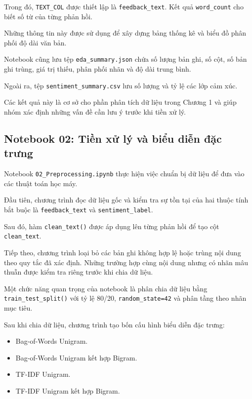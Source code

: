 Trong đó, \texttt{TEXT\_COL} được thiết lập là \texttt{feedback\_text}. Kết quả \texttt{word\_count} cho biết số từ của từng phản hồi.

Những thông tin này được sử dụng để xây dựng bảng thống kê và biểu đồ phân phối độ dài văn bản.

Notebook cũng lưu tệp \texttt{eda\_summary.json} chứa số lượng bản ghi, số cột, số bản ghi trùng, giá trị thiếu, phân phối nhãn và độ dài trung bình.

Ngoài ra, tệp \texttt{sentiment\_summary.csv} lưu số lượng và tỷ lệ các lớp cảm xúc.

Các kết quả này là cơ sở cho phần phân tích dữ liệu trong Chương 1 và giúp nhóm xác định những vấn đề cần lưu ý trước khi tiền xử lý.


\subsection{Notebook 02: Tiền xử lý và biểu diễn đặc trưng}

Notebook \texttt{02\_Preprocessing.ipynb} thực hiện việc chuẩn bị dữ liệu để đưa vào các thuật toán học máy.

Đầu tiên, chương trình đọc dữ liệu gốc và kiểm tra sự tồn tại của hai thuộc tính bắt buộc là \texttt{feedback\_text} và \texttt{sentiment\_label}.

Sau đó, hàm \texttt{clean\_text()} được áp dụng lên từng phản hồi để tạo cột \texttt{clean\_text}.

Tiếp theo, chương trình loại bỏ các bản ghi không hợp lệ hoặc trùng nội dung theo quy tắc đã xác định. Những trường hợp cùng nội dung nhưng có nhãn mâu thuẫn được kiểm tra riêng trước khi chia dữ liệu.

Một chức năng quan trọng của notebook là phân chia dữ liệu bằng \texttt{train\_test\_split()} với tỷ lệ 80/20, \texttt{random\_state=42} và phân tầng theo nhãn mục tiêu.

Sau khi chia dữ liệu, chương trình tạo bốn cấu hình biểu diễn đặc trưng:

\begin{itemize}
    \item Bag-of-Words Unigram.

    \item Bag-of-Words Unigram kết hợp Bigram.

    \item TF-IDF Unigram.

    \item TF-IDF Unigram kết hợp Bigram.
\end{itemize}

